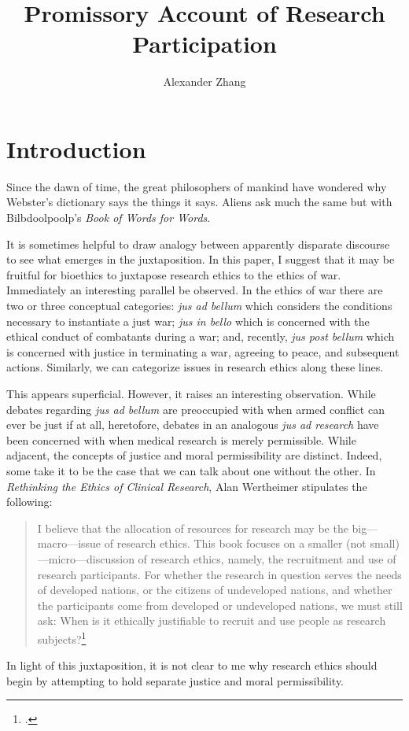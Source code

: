\documentclass[letterpaper,notitlepage,12pt]{article}
\title{Promissory Account of Research Participation}
\author{Alexander Zhang}
\date{}
\begin{document}
\maketitle

\section{Introduction}

Since the dawn of time, the great philosophers of mankind have wondered why
Webster's dictionary says the things it says.
Aliens ask much the same but with Bilbdoolpoolp's \textit{Book of Words for
Words}.

It is sometimes helpful to draw analogy between apparently disparate discourse
to see what emerges in the juxtaposition.
In this paper, I suggest that it may be fruitful for bioethics to juxtapose
research ethics to the ethics of war.
Immediately an interesting parallel be observed.
In the ethics of war there are two or three conceptual categories: \textit{
jus ad bellum} which considers the conditions necessary to instantiate a just
war; \textit{jus in bello} which is concerned with the ethical conduct of
combatants during a war; and, recently, \textit{jus post bellum} which is
concerned with justice in terminating a war, agreeing to peace, and subsequent
actions.
Similarly, we can categorize issues in research ethics along these lines.

This appears superficial.
However, it raises an interesting observation.
While debates regarding \textit{jus ad bellum} are preoccupied with when armed
conflict can ever be just if at all, heretofore, debates in an analogous
\textit{jus ad research} have been concerned with when medical research is
merely permissible.
While adjacent, the concepts of justice and moral permissibility are distinct.
Indeed, some take it to be the case that we can talk about one without the
other.
In \textit{Rethinking the Ethics of Clinical Research}, Alan Wertheimer
stipulates the following: \begin{quotation}
I believe that the allocation of resources for research may be the
big---macro---issue of research ethics. This book focuses on a smaller (not
small)---micro---discussion of research ethics, namely, the recruitment and use
of research participants. For whether the research in question serves the needs
of developed nations, or the citizens of undeveloped nations, and whether the
participants come from developed or undeveloped nations, we must still ask: When
is it ethically justifiable to recruit and use people as research
subjects?\footcite[p. 8]{wertheimer}
\end{quotation}
In light of this juxtaposition, it is not clear to me why research ethics should
begin by attempting to hold separate justice and moral permissibility.
\end{document}
